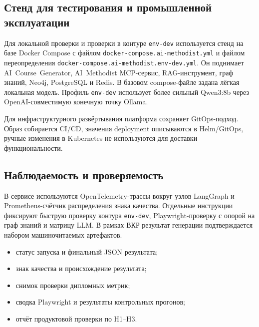 \subsection{Стенд для тестирования и промышленной эксплуатации}

Для локальной проверки и проверки в контуре \texttt{env-dev}
используется стенд на базе Docker Compose с файлом
\texttt{docker-compose.ai-methodist.yml} и файлом переопределения
\texttt{docker-compose.ai-methodist.env-dev.yml}. Он поднимает
AI~Course~Generator, AI~Methodist MCP-сервис, RAG-инструмент,
граф знаний, Neo4j, PostgreSQL и Redis. В базовом compose-файле задана
лёгкая локальная модель. Профиль \texttt{env-dev} использует более сильный
Qwen3:8b через OpenAI-совместимую конечную точку Ollama.

Для инфраструктурного развёртывания платформа сохраняет GitOps-подход.
Образ собирается CI/CD, значения deployment описываются в Helm/GitOps,
ручные изменения в Kubernetes не используются для доставки
функциональности.

\subsection{Наблюдаемость и проверяемость}

В сервисе используются OpenTelemetry-трассы вокруг узлов LangGraph и
Prometheus-счётчик распределения знака качества. Отдельные инструкции
фиксируют быструю проверку контура \texttt{env-dev}, Playwright-проверку с опорой на граф знаний
и матрицу LLM.
В рамках ВКР результат генерации подтверждается набором
машиночитаемых артефактов.

\begin{itemize}
  \item статус запуска и финальный JSON результата;
  \item знак качества и происхождение результата;
  \item снимок проверки дипломных метрик;
  \item сводка Playwright и результаты контрольных прогонов;
  \item отчёт продуктовой проверки по H1–H3.
\end{itemize}

